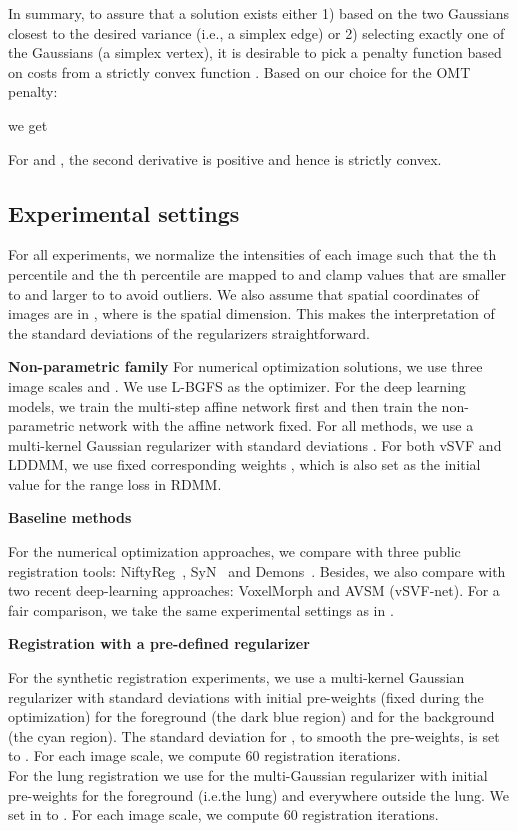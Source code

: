 \documentclass{article}
\numberwithin{equation}{section}
\newcommand{\ie}{{i.e.}}
\begin{document}
In summary, to assure that a solution exists either 1) based on the two Gaussians closest to the desired variance  (\ie, a simplex edge) or 2) selecting exactly one of the Gaussians (a simplex vertex), it is desirable to pick a penalty function based on costs from a strictly convex function . Based on our choice for the OMT penalty:

we get

For  and , the second derivative is positive and hence  is strictly convex.
 
\subsection{Experimental settings}
\label{sec:experimental_settings}

For all experiments, we normalize the intensities of each image such that the th percentile and the th percentile are mapped to  and clamp values that are smaller to  and larger to  to avoid outliers. We also assume that spatial coordinates of images are in , where  is the spatial dimension. This makes the interpretation of the standard deviations of the regularizers straightforward.

{\bf Non-parametric family} For numerical optimization solutions, we use three image scales  and . We use L-BGFS as the optimizer. For the deep learning models, we train the multi-step affine network first and then train the non-parametric network with the affine network fixed. For all methods, we use a multi-kernel Gaussian regularizer with standard deviations . For both vSVF and LDDMM, we use fixed corresponding weights , which is also set as the initial value for the range loss in RDMM.

{\bf Baseline methods} 

For the numerical optimization approaches, we compare with three public registration tools: NiftyReg~\cite{ourselin2001reconstructing,modat2014global,rueckert1999nonrigid,modat2010fast}, SyN~\cite{avants2009advanced,avants2008symmetric} and Demons~\cite{vercauteren2009diffeomorphic,vercauteren2008symmetric}. Besides, we also compare with two recent deep-learning approaches: VoxelMorph \cite{dalca2018unsupervised} and AVSM (vSVF-net)\cite{shen2019networks}. For a fair comparison, we take the same experimental settings as in \cite{shen2019networks}.

{\bf Registration with a pre-defined regularizer}

For the synthetic registration experiments, we use a multi-kernel Gaussian regularizer with standard deviations  with initial pre-weights  (fixed during the optimization) for the foreground (the dark blue region) and  for the background (the cyan region). The standard deviation for , to smooth the pre-weights, is set to . For each image scale, we compute 60 registration iterations. \\
For the lung registration we use  for the multi-Gaussian regularizer with initial pre-weights  for the foreground (\ie the lung) and  everywhere outside the lung. We set  in  to .  For each image scale, we compute 60 registration iterations.
\end{document}
